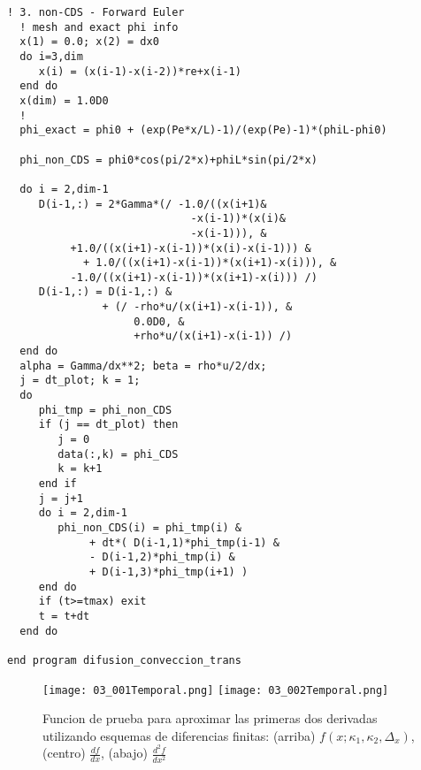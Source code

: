 \documentclass[9pt,technote,twoside,letterpaper,onecolumn]{IEEEtran}
\begin{document}
\begin{multicols}{2}
\begin{lstlisting}[caption={Algoritmo Forward-Euler, Runge-Kutta},label={lst:trans_alg}]
  ! 3. non-CDS - Forward Euler
  ! mesh and exact phi info
  x(1) = 0.0; x(2) = dx0
  do i=3,dim
     x(i) = (x(i-1)-x(i-2))*re+x(i-1)
  end do
  x(dim) = 1.0D0
  !
  phi_exact = phi0 + (exp(Pe*x/L)-1)/(exp(Pe)-1)*(phiL-phi0)

  phi_non_CDS = phi0*cos(pi/2*x)+phiL*sin(pi/2*x)

  do i = 2,dim-1
     D(i-1,:) = 2*Gamma*(/ -1.0/((x(i+1)&
                             -x(i-1))*(x(i)&
                             -x(i-1))), &
          +1.0/((x(i+1)-x(i-1))*(x(i)-x(i-1))) &
            + 1.0/((x(i+1)-x(i-1))*(x(i+1)-x(i))), &
          -1.0/((x(i+1)-x(i-1))*(x(i+1)-x(i))) /)
     D(i-1,:) = D(i-1,:) &
               + (/ -rho*u/(x(i+1)-x(i-1)), &
                    0.0D0, &
                    +rho*u/(x(i+1)-x(i-1)) /)
  end do
  alpha = Gamma/dx**2; beta = rho*u/2/dx;
  j = dt_plot; k = 1;
  do
     phi_tmp = phi_non_CDS
     if (j == dt_plot) then
        j = 0
        data(:,k) = phi_CDS
        k = k+1
     end if
     j = j+1
     do i = 2,dim-1
        phi_non_CDS(i) = phi_tmp(i) &
             + dt*( D(i-1,1)*phi_tmp(i-1) &
             - D(i-1,2)*phi_tmp(i) &
             + D(i-1,3)*phi_tmp(i+1) ) 
     end do
     if (t>=tmax) exit
     t = t+dt
  end do

end program difusion_conveccion_trans
\end{lstlisting}
\end{multicols}

\begin{figure}[!htb]
  \centering
  \texttt{[image: 03\_001Temporal.png]}
  \texttt{[image: 03\_002Temporal.png]}\\
  \label{fig:tmpfig}
  \caption{Funcion de prueba para aproximar las primeras dos derivadas utilizando esquemas de diferencias finitas: (arriba) $f(x;\kappa_1,\kappa_2,\Delta_x)$, (centro) $\frac{df}{dx}$, (abajo) $\frac{d^2f}{dx^2}$}
\end{figure}
\end{document}
